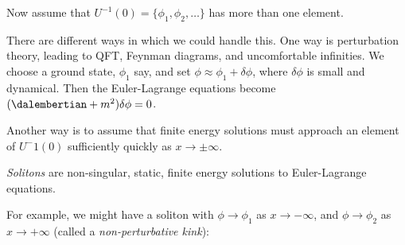 \documentclass{jknotes}
\begin{document}
Now assume that \(U^{-1}(0) = \{\phi_1,\phi_2,\dots\}\) has more than one element.

\begin{figure}[H]
    \centering
\end{figure}

There are different ways in which we could handle this. One way is perturbation theory, leading to QFT, Feynman diagrams, and uncomfortable infinities. We choose a ground state, \(\phi_1\) say, and set \(\phi\approx\phi_1+\delta\phi\), where \(\delta\phi\) is small and dynamical. Then the Euler-Lagrange equations become \((\dalembertian + m^2)\delta\phi=0\).

Another way is to assume that finite energy solutions must approach an element of \(U^-1(0)\) sufficiently quickly as \(x\to\pm\infty\).

\begin{defn}
    \emph{Solitons} are non-singular, static, finite energy solutions to Euler-Lagrange equations.
\end{defn}

For example, we might have a soliton with \(\phi\to\phi_1\) as \(x\to-\infty\), and \(\phi\to\phi_2\) as \(x\to+\infty\) (called a \emph{non-perturbative kink}):

\begin{figure}[H]
    \centering
\end{figure}
\end{document}
